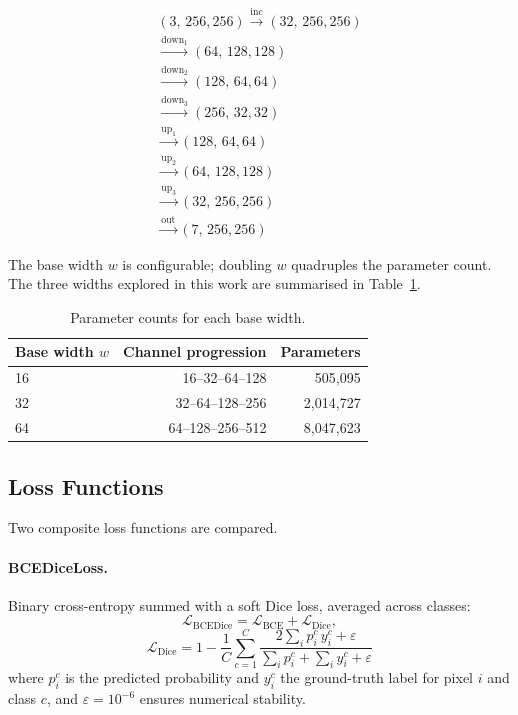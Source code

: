 \documentclass{aa}
\begin{document}
\[
\begin{array}{c}
(3,\,256,256)
\xrightarrow{\text{inc}}   (32,\,256,256)\\[2pt]
\xrightarrow{\text{down}_1}(64,\,128,128)\\[2pt]
\xrightarrow{\text{down}_2}(128,\,64,64)\\[2pt]
\xrightarrow{\text{down}_3}(256,\,32,32)\\[4pt]
\xrightarrow{\text{up}_1}  (128,\,64,64)\\[2pt]
\xrightarrow{\text{up}_2}  (64,\,128,128)\\[2pt]
\xrightarrow{\text{up}_3}  (32,\,256,256)\\[2pt]
\xrightarrow{\text{out}}   (7,\,256,256)
\end{array}
\]

\noindent
The base width $w$ is configurable; doubling $w$ quadruples the parameter count. The three widths explored in this work are summarised in Table~\ref{tab:bw_params}.

\begin{table}[htbp]
\centering
\caption{Parameter counts for each base width.}
\label{tab:bw_params}
\begin{tabular}{lrr}
\toprule
Base width $w$ & Channel progression & Parameters \\
\midrule
16 & 16--32--64--128  &    505{,}095 \\
32 & 32--64--128--256 & 2{,}014{,}727 \\
64 & 64--128--256--512 & 8{,}047{,}623 \\
\bottomrule
\end{tabular}
\end{table}

\subsection{Loss Functions}
\label{sec:mr_loss}

Two composite loss functions are compared.

\paragraph{BCEDiceLoss.}
Binary cross-entropy summed with a soft Dice loss, averaged across classes:
\[
\mathcal{L}_{\text{BCEDice}} = \mathcal{L}_{\text{BCE}} + \mathcal{L}_{\text{Dice}},
\]
\[
\mathcal{L}_{\text{Dice}} = 1 - \frac{1}{C}\sum_{c=1}^{C} \frac{2\sum_i p_i^c\, y_i^c + \varepsilon}{\sum_i p_i^c + \sum_i y_i^c + \varepsilon}
\]
where $p_i^c$ is the predicted probability and $y_i^c$ the ground-truth label for pixel $i$ and class $c$, and $\varepsilon=10^{-6}$ ensures numerical stability.
\end{document}
